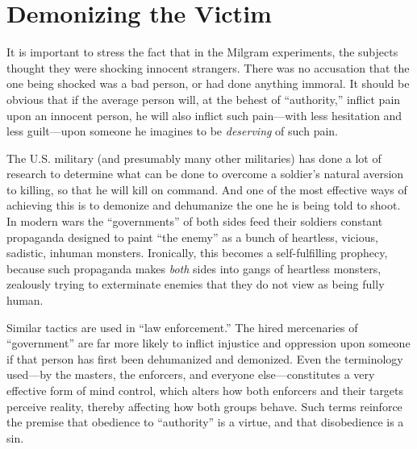 \documentclass{book}
\begin{document}
\section{Demonizing the Victim}

It is important to stress the fact that in the Milgram experiments, the subjects thought they were shocking innocent strangers. There was no accusation that the one being shocked was a bad person, or had done anything immoral. It should be obvious that if the average person will, at the behest of \enquote{authority,} inflict pain upon an innocent person, he will also inflict such pain---with less hesitation and less guilt---upon someone he imagines to be \emph{deserving} of such pain.

The U.S. military (and presumably many other militaries) has done a lot of research to determine what can be done to overcome a soldier's natural aversion to killing, so that he will kill on command. And one of the most effective ways of achieving this is to demonize and dehumanize the one he is being told to shoot. In modern wars the \enquote{governments} of both sides feed their soldiers constant propaganda designed to paint \enquote{the enemy} as a bunch of heartless, vicious, sadistic, inhuman monsters. Ironically, this becomes a self-fulfilling prophecy, because such propaganda makes \emph{both} sides into gangs of heartless monsters, zealously trying to exterminate enemies that they do not view as being fully human.

Similar tactics are used in \enquote{law enforcement.} The hired mercenaries of \enquote{government} are far more likely to inflict injustice and oppression upon someone if that person has first been dehumanized and demonized. Even the terminology used---by the masters, the enforcers, and everyone else---constitutes a very effective form of mind control, which alters how both enforcers and their targets perceive reality, thereby affecting how both groups behave. Such terms reinforce the premise that obedience to \enquote{authority} is a virtue, and that disobedience is a sin.
\end{document}
